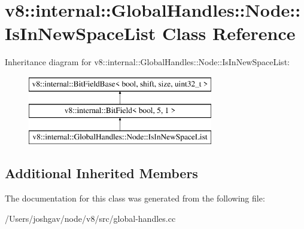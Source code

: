 \hypertarget{classv8_1_1internal_1_1_global_handles_1_1_node_1_1_is_in_new_space_list}{}\section{v8\+:\+:internal\+:\+:Global\+Handles\+:\+:Node\+:\+:Is\+In\+New\+Space\+List Class Reference}
\label{classv8_1_1internal_1_1_global_handles_1_1_node_1_1_is_in_new_space_list}
Inheritance diagram for v8\+:\+:internal\+:\+:Global\+Handles\+:\+:Node\+:\+:Is\+In\+New\+Space\+List\+:\begin{figure}[H]
\begin{center}
\leavevmode
\includegraphics[height=3.000000cm]{classv8_1_1internal_1_1_global_handles_1_1_node_1_1_is_in_new_space_list}
\end{center}
\end{figure}
\subsection*{Additional Inherited Members}


The documentation for this class was generated from the following file\+:\begin{DoxyCompactItemize}
\item 
/\+Users/joshgav/node/v8/src/global-\/handles.\+cc\end{DoxyCompactItemize}
